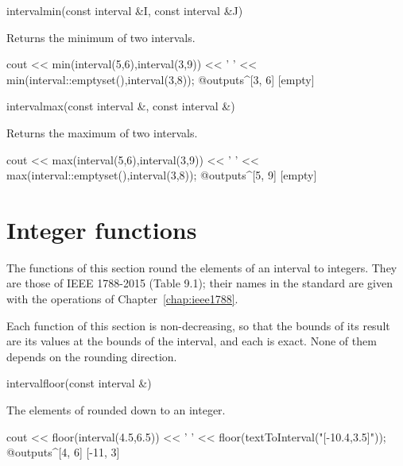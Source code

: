 \documentclass[12pt,a4paper,twoside,openright]{book}
\begin{document}
\begin{deffun}{interval}{min}{(const interval \&I, const interval \&J)}
  \begin{operation}
  \end{operation}
  Returns the minimum of two intervals.
  \begin{example}
cout << min(interval(5,6),interval(3,9)) << ' '
     << min(interval::emptyset(),interval(3,8));
@outputs^[3, 6] [empty]~
  \end{example}
\end{deffun}

\begin{deffun}{interval}{max}{(const interval \&, const interval \&)}
  \begin{operation}
  \end{operation}
  Returns the maximum of two intervals.
\begin{example}
cout << max(interval(5,6),interval(3,9)) << ' '
     << max(interval::emptyset(),interval(3,8));
@outputs^[5, 9] [empty]~
\end{example}
\end{deffun}

\section{Integer functions}\label{sec:functions-integer}
%

The functions of this section round the elements of an interval to
integers. They are those of IEEE 1788-2015 (Table 9.1); their names in the
standard are given with the operations of Chapter~\ref{chap:ieee1788}.

\begin{Prop}\label{prop:functions-integer}
Each function of this section is non-decreasing, so that the bounds of its
result are its values at the bounds of the interval, and each is exact.
None of them depends on the rounding direction.
\end{Prop}

\begin{deffun}{interval}{floor}{(const interval \&)}
  \begin{operation}
  \end{operation}
  The elements of  rounded down to an integer.
  \begin{example}
cout << floor(interval(4.5,6.5)) << ' '
     << floor(textToInterval("[-10.4,3.5]"));
@outputs^[4, 6] [-11, 3]~
  \end{example}
\end{deffun}
\end{document}
